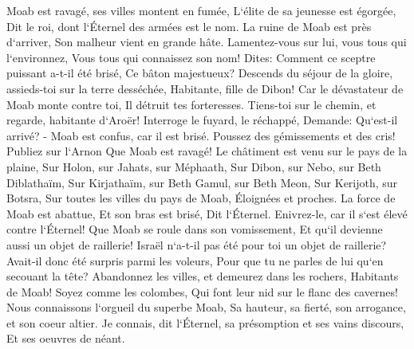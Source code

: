 \verse Moab est ravagé, ses villes montent en fumée, L`élite de sa jeunesse est égorgée, Dit le roi, dont l`Éternel des armées est le nom. 
\verse La ruine de Moab est près d`arriver, Son malheur vient en grande hâte. 
\verse Lamentez-vous sur lui, vous tous qui l`environnez, Vous tous qui connaissez son nom! Dites: Comment ce sceptre puissant a-t-il été brisé, Ce bâton majestueux? 
\verse Descends du séjour de la gloire, assieds-toi sur la terre desséchée, Habitante, fille de Dibon! Car le dévastateur de Moab monte contre toi, Il détruit tes forteresses. 
\verse Tiens-toi sur le chemin, et regarde, habitante d`Aroër! Interroge le fuyard, le réchappé, Demande: Qu`est-il arrivé? - 
\verse Moab est confus, car il est brisé. Poussez des gémissements et des cris! Publiez sur l`Arnon Que Moab est ravagé! 
\verse Le châtiment est venu sur le pays de la plaine, Sur Holon, sur Jahats, sur Méphaath, 
\verse Sur Dibon, sur Nebo, sur Beth Diblathaïm, 
\verse Sur Kirjathaïm, sur Beth Gamul, sur Beth Meon, 
\verse Sur Kerijoth, sur Botsra, Sur toutes les villes du pays de Moab, Éloignées et proches. 
\verse La force de Moab est abattue, Et son bras est brisé, Dit l`Éternel. 
\verse Enivrez-le, car il s`est élevé contre l`Éternel! Que Moab se roule dans son vomissement, Et qu`il devienne aussi un objet de raillerie! 
\verse Israël n`a-t-il pas été pour toi un objet de raillerie? Avait-il donc été surpris parmi les voleurs, Pour que tu ne parles de lui qu`en secouant la tête? 
\verse Abandonnez les villes, et demeurez dans les rochers, Habitants de Moab! Soyez comme les colombes, Qui font leur nid sur le flanc des cavernes! 
\verse Nous connaissons l`orgueil du superbe Moab, Sa hauteur, sa fierté, son arrogance, et son coeur altier. 
\verse Je connais, dit l`Éternel, sa présomption et ses vains discours, Et ses oeuvres de néant. 
